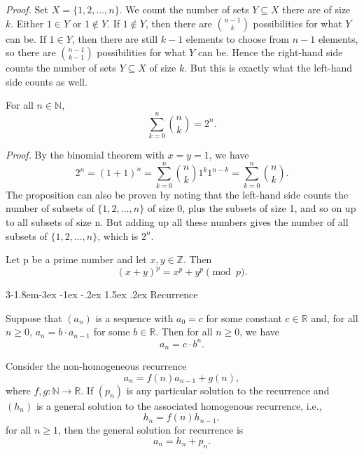 \documentclass{tufte-handout}
\makeatletter
\renewcommand{\subsection}{\@startsection{subsection}%
    {3}{-1.8em}{-3ex \@plus -1ex \@minus -.2ex}%
    {1.5ex \@plus .2ex}
    {\hspace*{-5.5em}\fcolorbox{ltblue}{ltblue}{\parbox[c][1.0ex][b]{4em}{\phantom{space}}}
    \normalfont\large\itshape\color{ltblue}}}
\makeatother
\begin{document}
\textit{Proof.} Set \( X = \{1,2,\ldots,n\} \). We count the number of sets \( Y \subseteq X  \) there 
are of size \( k  \). Either \( 1 \in Y  \) or \( 1 \notin Y  \). If \( 1 \notin Y  \),
then there are \( \binom{n-1}{k} \) possibilities for what \( Y \) can be. If \( 1 \in Y  \),
then there are still \( k-1 \) elements to choose from \( n-1 \) elements, so there are \( \binom{n-1}{k-1} \) possibilities for what \( Y \) can be. 
Hence the right-hand side counts the number of sets \( Y \subseteq X \) of size \( k \). But
this is exactly what the left-hand side counts as well. \hfill \qedsymbol

\begin{Proposition}
    For all \( n \in \mathbb{N} \),
    \[\sum_{k=0}^{n}\binom{n}{k} = 2^n.\]
\end{Proposition}

\textit{Proof.} By the binomial theorem with \( x = y = 1 \), we have
\[2^n = (1+1)^n = \sum_{k=0}^{n}\binom{n}{k}1^k 1^{n-k}= \sum_{k=0}^{n}\binom{n}{k}.\]
The proposition can also be proven by noting that the left-hand side counts the number of subsets of
\( \{1,2,\ldots,n \} \) of size 0, plus the subsets of size 1, and so on up to all subsets of size n.
But adding up all these numbers gives the number of all subsets of \( \{1,2,\ldots,n \} \), which is \( 2^n \). \hfill \qedsymbol 

\begin{Theorem}
    Let p be a prime number and let \( x,y \in \mathbb{Z}\).
    Then 
    \[(x+y)^p=x^p + y^p \pmod{p}.\]
\end{Theorem}


\subsection{Recurrence}
\begin{Proposition}
    Suppose that \( (a_n)\) is a sequence with \( a_0=c \)
    for some constant \( c \in \mathbb{R} \) and, for all \( n \geq 0 \),
    \( a_n=b\cdot a_{n-1} \) for some \( b \in \mathbb{R} \). Then for all \( n \geq 0 \),
    we have
    \[ a_n = c\cdot b^n.\]
\end{Proposition}

\begin{Theorem}
    Consider the non-homogeneous recurrence
    \[ a_n = f(n)a_{n-1} + g(n),\]
    where \( f,g: \mathbb{N} \to \mathbb{R} \). If \( (p_n) \) is 
    any particular solution to the recurrence and \( (h_n) \) is a
    general solution to the associated homogenous recurrence, i.e.,
    \[ h_n = f(n)h_{n-1},\]
    for all \( n \geq 1 \), then the general solution
    for recurrence is
    \[ a_n = h_n + p_n.\]
\end{Theorem}
\end{document}
